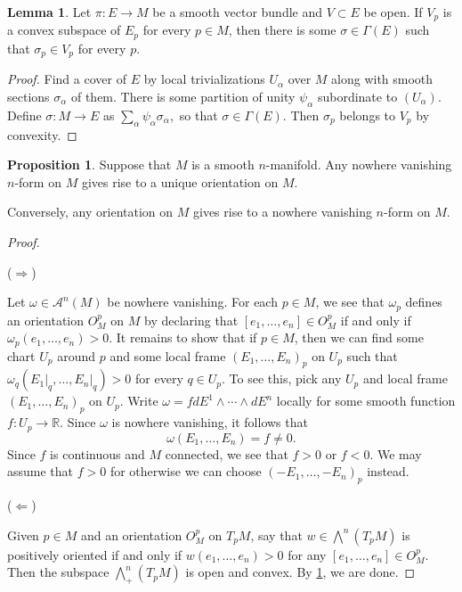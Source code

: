 \documentclass[10pt,letterpaper,cm]{nupset}
\theoremstyle{definition}
\theoremstyle{theorem}
\newtheorem{lemma}[definition]{Lemma}
\newtheorem{prop}[definition]{Proposition}
\theoremstyle{remark}
\newcommand{\R}{\mathbb R}
\newcommand{\1}{\mathbf{1}}
\newcommand{\0}{\vec 0}
\begin{document}
\begin{lemma}\label{convex}
Let $\pi : E \to M$ be a smooth vector bundle and $V \subset E$ be open. If $V_p$ is a convex subspace of $E_p$ for every $p\in M$, then there is some $\sigma \in \Gamma(E)$ such that $\sigma_p \in V_p$ for every $p$.
\end{lemma}
\begin{proof}
Find a cover of $E$ by local trivializations $U_{\alpha}$ over $M$ along with smooth sections $\sigma_{\alpha}$ of them. There is some partition of unity $\psi_{\alpha}$ subordinate to $\left(U_{\alpha}\right)$. Define $\sigma: M \to E$ as $\sum_{\alpha} \psi_{\alpha}\sigma_{\alpha} ,$ so that $\sigma \in \Gamma(E)$. Then $\sigma_p$ belongs to $V_p$ by convexity.
\end{proof}

\begin{prop}\label{nwv}
Suppose that $M$ is a smooth $n$-manifold. Any nowhere vanishing $n$-form on $M$ gives rise to a unique orientation on $M$. 

Conversely, any orientation on $M$ gives rise to a nowhere vanishing $n$-form on $M$.
\end{prop}
\begin{proof} $ $
\smallskip

($\Longrightarrow$)

Let $\omega \in \mathcal{A}^n(M)$ be nowhere vanishing. For each $p \in M$, we see that $\omega_p$ defines an orientation $O_M^p$ on $M$ by declaring that $\left[e_1, \ldots, e_n\right] \in  O_M^p$ if and only if $\omega_p(e_1, \ldots, e_n) >0$. It remains to show that if $p\in M$, then we can find some chart $U_p$ around $p$ and some local frame $\left(E_1, \ldots, E_n\right)_p$ on $U_p$ such that $\omega_q(E_1\bigr\rvert_q, \ldots, E_n\bigr\rvert_q) >0$ for every $q \in U_p$. To see this, pick any $U_p$ and local frame $\left(E_1, \ldots, E_n\right)_p$ on $U_p$. Write $\omega = fdE^1 \wedge \cdots \wedge dE^n$ locally for some smooth function $f: U_p \to \R$. Since $\omega$ is nowhere vanishing, it follows that $$\omega(E_1, \ldots, E_n) = f \ne 0.$$ Since $f$ is continuous and $M$ connected, we see that $f>0$ or $f<0$. We may assume that $f>0$ for otherwise we can choose $\left({-E_1}, \ldots, {-E_n}\right)_p$ instead. 

\medskip

($\Longleftarrow$)

Given $p\in M$ and an orientation $O_M^p$ on $T_pM$, say that $w \in \bigwedge^n(T_pM)$ is positively oriented if and only if $w(e_1, \ldots, e_n) >0$ for any $\left[e_1, \ldots, e_n\right] \in O_M^p$. Then the subspace $\bigwedge^n_+(T_pM)$ is open and convex. By \cref{convex}, we are done.
\end{proof}
\end{document}

